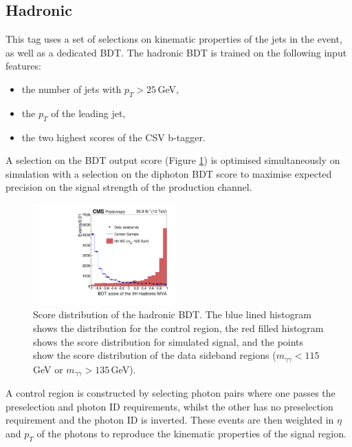 \subsection{\ttH Hadronic}
This tag uses a set of selections on kinematic properties of the jets in the event, as well as a dedicated BDT. The \ttH hadronic BDT is trained on the following input features:
\begin{itemize}[leftmargin=.5in,noitemsep]
    \item the number of jets with $p_{T} > 25$\,GeV,
    \item the $p_{T}$ of the leading jet,
    \item the two highest scores of the CSV b-tagger.
\end{itemize}
A selection on the BDT output score (Figure \ref{fig:event_categorisaton:tth_hadronic_bdt}) is optimised simultaneously on simulation with a selection on the diphoton BDT score to maximise expected precision on the signal strength of the \ttH production channel. 
\begin{figure}[h!]
    \includegraphics[width=0.49\textwidth]{figures/event_selection/Figure_006.pdf}
    \caption{Score distribution of the hadronic \ttH BDT. The blue lined histogram shows the distribution for the control region, the red filled histogram shows the score distribution for simulated signal, and the points show the score distribution of the data sideband regions ($m_{\gamma\gamma} < 115$\,GeV or $m_{\gamma\gamma} > 135$\,GeV).}
        \label{fig:event_categorisaton:tth_hadronic_bdt}
\end{figure}

A control region is constructed by selecting photon pairs where one passes the preselection and photon ID requirements, whilst the other has no preselection requirement and the photon ID is inverted.
These events are then weighted in $\eta$ and $p_T$ of the photons to reproduce the kinematic properties of the signal region.


